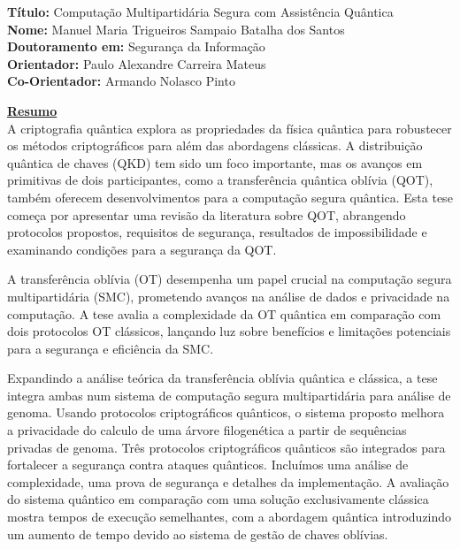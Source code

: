 \documentclass[12pt]{report}
\begin{document}
	


\noindent \textbf{T\'{i}tulo:} Computa\c{c}\~{a}o Multipartid\'{a}ria Segura com Assist\^{e}ncia Qu\^{a}ntica\\
\textbf{Nome:} Manuel Maria Trigueiros Sampaio Batalha dos Santos\\
\textbf{Doutoramento em:} Seguran\c{c}a da Informa\c{c}\~{a}o\\
\textbf{Orientador:} Paulo Alexandre Carreira Mateus\\
\textbf{Co-Orientador:} Armando Nolasco Pinto\\
\vspace{2\baselineskip}

\underline{\textbf{Resumo}}\\
A criptografia quântica explora as propriedades da física quântica para robustecer os métodos criptográficos para além das abordagens clássicas. A distribuição quântica de chaves (QKD) tem sido um foco importante, mas os avanços em primitivas de dois participantes, como a transferência quântica oblívia (QOT), também oferecem desenvolvimentos para a computação segura quântica. Esta tese começa por apresentar uma revisão da literatura sobre QOT, abrangendo protocolos propostos, requisitos de segurança, resultados de impossibilidade e examinando condições para a segurança da QOT.

A transferência oblívia (OT) desempenha um papel crucial na computação segura multipartidária (SMC), prometendo avanços na análise de dados e privacidade na computação. A tese avalia a complexidade da OT quântica em comparação com dois protocolos OT clássicos, lançando luz sobre benefícios e limitações potenciais para a segurança e eficiência da SMC.

Expandindo a análise teórica da transferência oblívia quântica e clássica, a tese integra ambas num sistema de computação segura multipartidária para análise de genoma. Usando protocolos criptográficos quânticos, o sistema proposto melhora a privacidade do calculo de uma árvore filogenética a partir de sequências privadas de genoma. Três protocolos criptográficos quânticos são integrados para fortalecer a segurança contra ataques quânticos. Incluímos uma análise de complexidade, uma prova de segurança e detalhes da implementação. A avaliação do sistema quântico em comparação com uma solução exclusivamente clássica mostra tempos de execução semelhantes, com a abordagem quântica introduzindo um aumento de tempo devido ao sistema de gestão de chaves oblívias.
\end{document}
